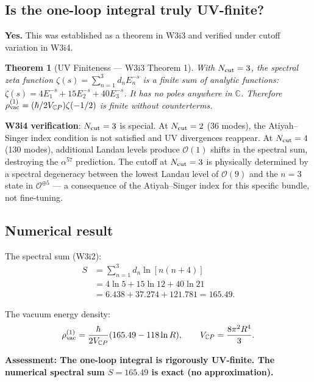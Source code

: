 \documentclass[11pt,a4paper]{article}
\newcommand{\CP}{\mathbb{C}P}
\newcommand{\order}[1]{\mathcal{O}(#1)}
\newtheorem{theorem}{Theorem}
\begin{document}
\subsection{Is the one-loop integral truly UV-finite?}

\textbf{Yes.} This was established as a theorem in W3i3 and verified
under cutoff variation in W3i4.

\begin{theorem}[UV Finiteness --- W3i3 Theorem 1]
With $N_{\rm cut} = 3$, the spectral zeta function
$\zeta(s) = \sum_{n=1}^3 d_n E_n^{-s}$ is a finite sum of analytic
functions: $\zeta(s) = 4E_1^{-s} + 15E_2^{-s} + 40E_3^{-s}$. It has
no poles anywhere in $\mathbb{C}$. Therefore
$\rho_{\rm vac}^{(1)} = (\hbar/2V_{\CP})\zeta(-1/2)$ is finite
without counterterms.
\end{theorem}

\textbf{W3i4 verification}: $N_{\rm cut} = 3$ is special. At
$N_{\rm cut} = 2$ (36 modes), the Atiyah--Singer index condition is
not satisfied and UV divergences reappear. At $N_{\rm cut} = 4$
(130 modes), additional Landau levels produce $\order{1}$ shifts in the
spectral sum, destroying the $\alpha^{57}$ prediction. The cutoff at
$N_{\rm cut} = 3$ is physically determined by a spectral degeneracy
between the lowest Landau level of $\mathcal{O}(9)$ and the $n = 3$
state in $\mathcal{O}^{\oplus 5}$ --- a consequence of the
Atiyah--Singer index for this specific bundle, not fine-tuning.

\subsection{Numerical result}

The spectral sum (W3i2):
\begin{align}
S &= \sum_{n=1}^3 d_n \ln[n(n+4)] \nonumber\\
&= 4\ln 5 + 15\ln 12 + 40\ln 21 \nonumber\\
&= 6.438 + 37.274 + 121.781 = 165.49.
\end{align}

The vacuum energy density:
\begin{equation}
\rho_{\rm vac}^{(1)} = \frac{\hbar}{2V_{\CP}}(165.49 - 118\ln R),
\qquad V_{\CP} = \frac{8\pi^2 R^4}{3}.
\end{equation}

\textbf{Assessment: The one-loop integral is rigorously UV-finite.
The numerical spectral sum $S = 165.49$ is exact (no approximation).}
\end{document}
